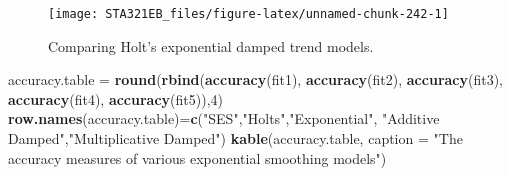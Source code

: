 \documentclass[
]{book}
\newenvironment{Shaded}{\begin{snugshade}}{\end{snugshade}}
\newcommand{\AttributeTok}[1]{\textcolor[rgb]{0.13,0.29,0.53}{#1}}
\newcommand{\DecValTok}[1]{\textcolor[rgb]{0.00,0.00,0.81}{#1}}
\newcommand{\DocumentationTok}[1]{\textcolor[rgb]{0.56,0.35,0.01}{\textbf{\textit{#1}}}}
\newcommand{\FloatTok}[1]{\textcolor[rgb]{0.00,0.00,0.81}{#1}}
\newcommand{\FunctionTok}[1]{\textcolor[rgb]{0.13,0.29,0.53}{\textbf{#1}}}
\newcommand{\NormalTok}[1]{#1}
\newcommand{\OtherTok}[1]{\textcolor[rgb]{0.56,0.35,0.01}{#1}}
\newcommand{\SpecialCharTok}[1]{\textcolor[rgb]{0.81,0.36,0.00}{\textbf{#1}}}
\newcommand{\StringTok}[1]{\textcolor[rgb]{0.31,0.60,0.02}{#1}}
\begin{document}
\begin{Shaded}
\end{Shaded}

\begin{figure}

{\centering \texttt{[image: STA321EB\_files/figure-latex/unnamed-chunk-242-1]} 

}

\caption{Comparing Holt's exponential damped trend models.}\label{fig:unnamed-chunk-242}
\end{figure}

\begin{Shaded}
\begin{Highlighting}[]
\NormalTok{accuracy.table }\OtherTok{=} \FunctionTok{round}\NormalTok{(}\FunctionTok{rbind}\NormalTok{(}\FunctionTok{accuracy}\NormalTok{(fit1), }\FunctionTok{accuracy}\NormalTok{(fit2), }\FunctionTok{accuracy}\NormalTok{(fit3), }
                             \FunctionTok{accuracy}\NormalTok{(fit4), }\FunctionTok{accuracy}\NormalTok{(fit5)),}\DecValTok{4}\NormalTok{)}
\FunctionTok{row.names}\NormalTok{(accuracy.table)}\OtherTok{=}\FunctionTok{c}\NormalTok{(}\StringTok{"SES"}\NormalTok{,}\StringTok{"Holt\textquotesingle{}s"}\NormalTok{,}\StringTok{"Exponential"}\NormalTok{,}
                    \StringTok{"Additive Damped"}\NormalTok{,}\StringTok{"Multiplicative Damped"}\NormalTok{)}
\FunctionTok{kable}\NormalTok{(accuracy.table, }\AttributeTok{caption =} \StringTok{"The accuracy measures of various exponential }
\StringTok{      smoothing models"}\NormalTok{)}
\end{Highlighting}
\end{Shaded}
\end{document}
